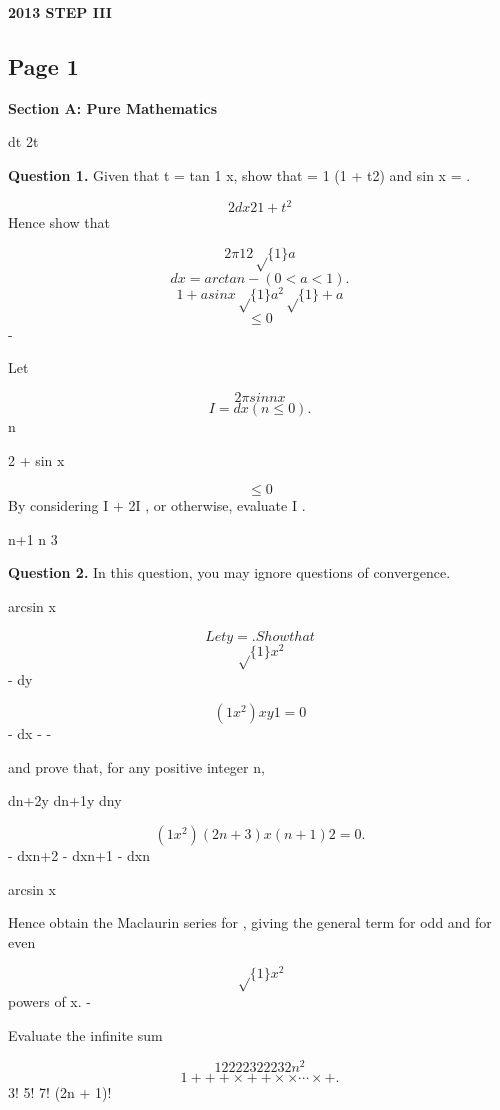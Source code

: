 \documentclass[12pt]{article}
\begin{document}
\begin{center}
{\Large \textbf{2013 STEP III}}
\end{center}

\subsection*{Page 1}
\begin{flushleft}
\bigskip\textbf{Section A: Pure Mathematics}\par
dt 2t\par
\bigskip\textbf{Question 1.} Given that t = tan 1 x, show that = 1 (1 + t2) and sin x = .\par
\[2 dx 2 1 + t^2\]
Hence show that\par
\[2 \pi 1 2 \sqrt\{1\} a\]
\[dx = arctan - (0 < a < 1).\]
\[1 + a sin x \sqrt\{1\} a^2 \sqrt\{1\} + a\]
\[\leq0\]
-\par
Let\par
\[2 \pi sinn x\]
\[I = dx (n \leq 0).\]
n\par
2 + sin x\par
\[\leq0\]
By considering I + 2I , or otherwise, evaluate I .\par
n+1 n 3\par
\bigskip\textbf{Question 2.} In this question, you may ignore questions of convergence.\par
arcsin x\par
\[Let y = . Show that\]
\[\sqrt\{1\} x^2\]
- dy\par
\[(1 x^2) xy 1 = 0\]
- dx - -\par
and prove that, for any positive integer n,\par
dn+2y dn+1y dny\par
\[(1 x^2) (2n + 3)x (n + 1)2 = 0 .\]
- dxn+2 - dxn+1 - dxn\par
arcsin x\par
Hence obtain the Maclaurin series for , giving the general term for odd and for even\par
\[\sqrt\{1\} x^2\]
powers of x. -\par
Evaluate the infinite sum\par
\[1 22 22 32 22 32 n^2\]
\[1 + + + \times + + \times \times \cdots \times + .\]
3! 5! 7! \cdots (2n + 1)! \cdots\par
\end{flushleft}
\end{document}
